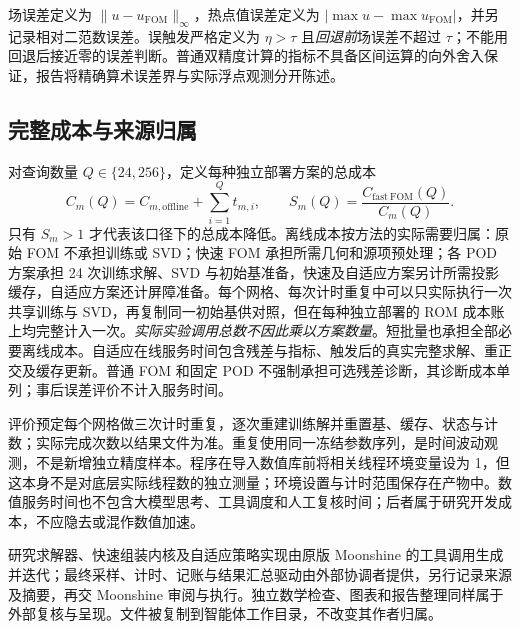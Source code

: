 场误差定义为 $\|u-u_{\mathrm{FOM}}\|_\infty$，热点值误差定义为 $|\max u-\max u_{\mathrm{FOM}}|$，并另记录相对二范数误差。误触发严格定义为 $\eta>\tau$ 且\emph{回退前}场误差不超过 $\tau$；不能用回退后接近零的误差判断。普通双精度计算的指标不具备区间运算的向外舍入保证，报告将精确算术误差界与实际浮点观测分开陈述。

\subsection{完整成本与来源归属}
对查询数量 $Q\in\{24,256\}$，定义每种独立部署方案的总成本
\[
 C_m(Q)=C_{m,\mathrm{offline}}+\sum_{i=1}^{Q}t_{m,i},
 \qquad S_m(Q)=\frac{C_{\mathrm{fast\ FOM}}(Q)}{C_m(Q)}.
\]
只有 $S_m>1$ 才代表该口径下的总成本降低。离线成本按方法的实际需要归属：原始 FOM 不承担训练或 SVD；快速 FOM 承担所需几何和源项预处理；各 POD 方案承担 24 次训练求解、SVD 与初始基准备，快速及自适应方案另计所需投影缓存，自适应方案还计屏障准备。每个网格、每次计时重复中可以只实际执行一次共享训练与 SVD，再复制同一初始基供对照，但在每种独立部署的 ROM 成本账上均完整计入一次。\emph{实际实验调用总数不因此乘以方案数量}。短批量也承担全部必要离线成本。自适应在线服务时间包含残差与指标、触发后的真实完整求解、重正交及缓存更新。普通 FOM 和固定 POD 不强制承担可选残差诊断，其诊断成本单列；事后误差评价不计入服务时间。

评价预定每个网格做三次计时重复，逐次重建训练解并重置基、缓存、状态与计数；实际完成次数以结果文件为准。重复使用同一冻结参数序列，是时间波动观测，不是新增独立精度样本。程序在导入数值库前将相关线程环境变量设为 1，但这本身不是对底层实际线程数的独立测量；环境设置与计时范围保存在产物中。数值服务时间也不包含大模型思考、工具调度和人工复核时间；后者属于研究开发成本，不应隐去或混作数值加速。

研究求解器、快速组装内核及自适应策略实现由原版 Moonshine 的工具调用生成并迭代；最终采样、计时、记账与结果汇总驱动由外部协调者提供，另行记录来源及摘要，再交 Moonshine 审阅与执行。独立数学检查、图表和报告整理同样属于外部复核与呈现。文件被复制到智能体工作目录，不改变其作者归属。
